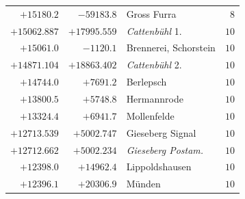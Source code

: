 \begin{center}
\begin{tabular}{r|r|p{170pt}|r}
\(+15180.2\)&\(-59183.8\)&Gross Furra&\(8\)\\
\(+15062.887\)&\(+17995.559\)&\textit{Cattenbühl} 1.&\(10\)\\
\(+15061.0\)&\(-1120.1\)&Brennerei, Schorstein&\(10\)\\
\(+14871.104\)&\(+18863.402\)&\textit{Cattenbühl} 2.&\(10\)\\
\(+14744.0\)&\(+7691.2\)&Berlepsch&\(10\)\\
\(+13800.5\)&\(+5748.8\)&Hermannrode&\(10\)\\
\(+13324.4\)&\(+6941.7\)&Mollenfelde&\(10\)\\
\(+12713.539\)&\(+5002.747\)&Gieseberg Signal&\(10\)\\
\(+12712.662\)&\(+5002.234\)&\textit{Gieseberg Postam.}&\(10\)\\
\(+12398.0\)&\(+14962.4\)&Lippoldshausen&\(10\)\\
\(+12396.1\)&\(+20306.9\)&Münden&\(10\)\\
\hline\end{tabular}\endgroup\end{center}
\clearpage
